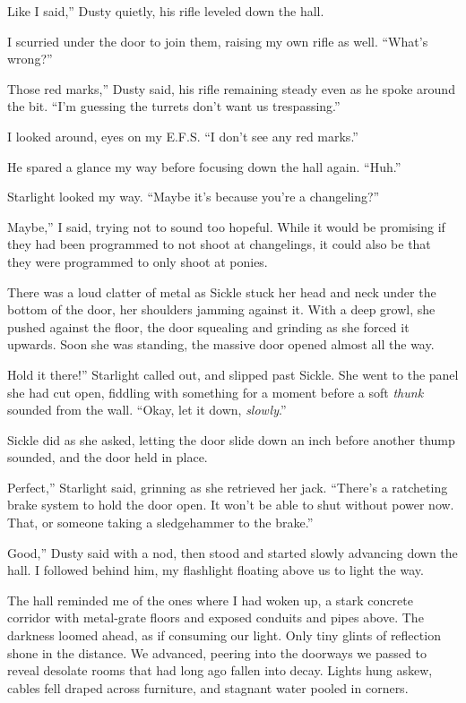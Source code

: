 \leavevmode{}Like I said,” Dusty quietly, his rifle leveled down the hall.

I scurried under the door to join them, raising my own rifle as well. “What’s wrong?”

\leavevmode{}Those red marks,” Dusty said, his rifle remaining steady even as he spoke around the bit. “I’m guessing the turrets don’t want us trespassing.”

I looked around, eyes on my E.F.S. “I don’t see any red marks.”

He spared a glance my way before focusing down the hall again. “Huh.”

Starlight looked my way. “Maybe it’s because you’re a changeling?”

\leavevmode{}Maybe,” I said, trying not to sound too hopeful. While it would be promising if they had been programmed to not shoot at changelings, it could also be that they were programmed to only shoot at ponies.

There was a loud clatter of metal as Sickle stuck her head and neck under the bottom of the door, her shoulders jamming against it. With a deep growl, she pushed against the floor, the door squealing and grinding as she forced it upwards. Soon she was standing, the massive door opened almost all the way.

\leavevmode{}Hold it there!” Starlight called out, and slipped past Sickle. She went to the panel she had cut open, fiddling with something for a moment before a soft \textit{thunk} sounded from the wall. “Okay, let it down, \textit{slowly}.”

Sickle did as she asked, letting the door slide down an inch before another thump sounded, and the door held in place.

\leavevmode{}Perfect,” Starlight said, grinning as she retrieved her jack. “There’s a ratcheting brake system to hold the door open. It won’t be able to shut without power now. That, or someone taking a sledgehammer to the brake.”

\leavevmode{}Good,” Dusty said with a nod, then stood and started slowly advancing down the hall. I followed behind him, my flashlight floating above us to light the way.

The hall reminded me of the ones where I had woken up, a stark concrete corridor with metal-grate floors and exposed conduits and pipes above. The darkness loomed ahead, as if consuming our light. Only tiny glints of reflection shone in the distance. We advanced, peering into the doorways we passed to reveal desolate rooms that had long ago fallen into decay. Lights hung askew, cables fell draped across furniture, and stagnant water pooled in corners.

